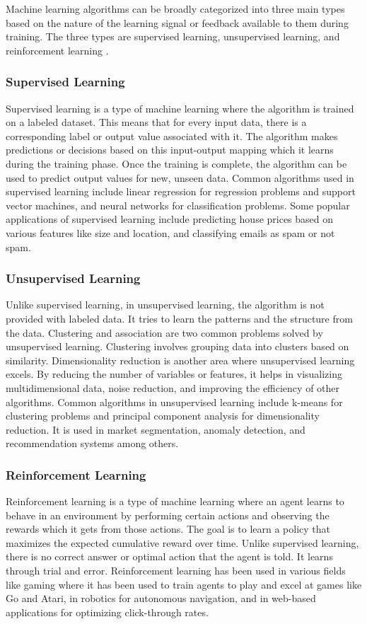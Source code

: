 Machine learning algorithms can be broadly categorized into three main types based on the nature of the learning signal or feedback available to them during training. The three types are supervised learning, unsupervised learning, and reinforcement learning \cite[p. 10 f.]{ketkar21}.

\subsubsection{Supervised Learning}
Supervised learning is a type of machine learning where the algorithm is trained on a labeled dataset. This means that for every input data, there is a corresponding label or output value associated with it. The algorithm makes predictions or decisions based on this input-output mapping which it learns during the training phase. Once the training is complete, the algorithm can be used to predict output values for new, unseen data. Common algorithms used in supervised learning include linear regression for regression problems and support vector machines, and neural networks for classification problems. Some popular applications of supervised learning include predicting house prices based on various features like size and location, and classifying emails as spam or not spam.

\subsubsection{Unsupervised Learning}
Unlike supervised learning, in unsupervised learning, the algorithm is not provided with labeled data. It tries to learn the patterns and the structure from the data. Clustering and association are two common problems solved by unsupervised learning. Clustering involves grouping data into clusters based on similarity. Dimensionality reduction is another area where unsupervised learning excels. By reducing the number of variables or features, it helps in visualizing multidimensional data, noise reduction, and improving the efficiency of other algorithms. Common algorithms in unsupervised learning include k-means for clustering problems and principal component analysis for dimensionality reduction. It is used in market segmentation, anomaly detection, and recommendation systems among others.

\subsubsection{Reinforcement Learning}
Reinforcement learning is a type of machine learning where an agent learns to behave in an environment by performing certain actions and observing the rewards which it gets from those actions. The goal is to learn a policy that maximizes the expected cumulative reward over time. Unlike supervised learning, there is no correct answer or optimal action that the agent is told. It learns through trial and error. Reinforcement learning has been used in various fields like gaming where it has been used to train agents to play and excel at games like Go and Atari, in robotics for autonomous navigation, and in web-based applications for optimizing click-through rates.

